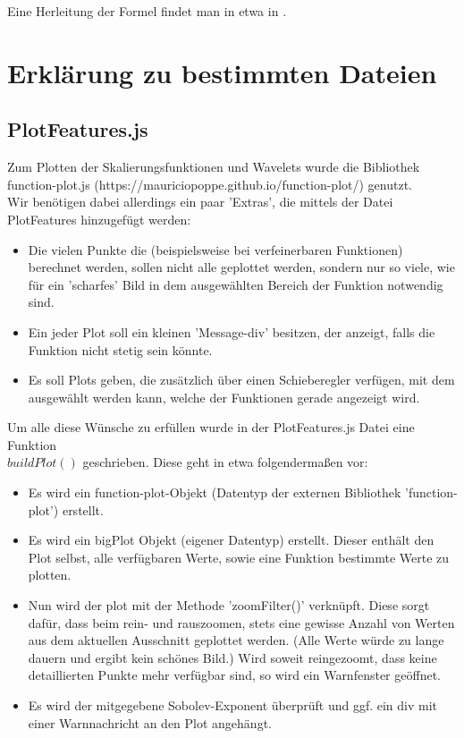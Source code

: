 \documentclass[11pt,a4paper,titlepage]{article}
\theoremstyle{plain} %
\theoremstyle{definition} %
\numberwithin{equation}{section} %
\begin{document}
	Eine Herleitung der Formel findet man in etwa in \cite{LycheMorken}.
	
	\newpage
	\section{Erklärung zu bestimmten Dateien}
				
		\subsection{PlotFeatures.js}
		Zum Plotten der Skalierungsfunktionen und Wavelets wurde die Bibliothek function-plot.js (https://mauriciopoppe.github.io/function-plot/) genutzt. \\
		Wir benötigen dabei allerdings ein paar 'Extras', die mittels der Datei PlotFeatures hinzugefügt werden:\\
		
		\begin{itemize}
			\item Die vielen Punkte die (beispielsweise bei verfeinerbaren Funktionen) berechnet werden, sollen nicht alle geplottet werden, sondern nur so viele, wie für ein 'scharfes' Bild in dem ausgewählten Bereich der Funktion notwendig sind.
			\item Ein jeder Plot soll ein kleinen 'Message-div' besitzen, der anzeigt, falls die Funktion nicht stetig sein könnte.
			\item Es soll Plots geben, die zusätzlich über einen Schieberegler verfügen, mit dem ausgewählt werden kann, welche der Funktionen gerade angezeigt wird.
		\end{itemize}
		
		Um alle diese Wünsche zu erfüllen wurde in der PlotFeatures.js Datei eine Funktion\\
		$buildPlot()$ geschrieben. Diese geht in etwa folgendermaßen vor:
		\begin{itemize}
			\item Es wird ein function-plot-Objekt (Datentyp der externen Bibliothek 'function-plot') erstellt.
			\item Es wird ein bigPlot Objekt (eigener Datentyp) erstellt. Dieser enthält den Plot selbst, alle verfügbaren Werte, sowie eine Funktion bestimmte Werte zu plotten.
			\item Nun wird der plot mit der Methode 'zoomFilter()' verknüpft. Diese sorgt dafür, dass beim rein- und rauszoomen, stets eine gewisse Anzahl von Werten aus dem aktuellen Ausschnitt geplottet  werden. (Alle Werte würde zu lange dauern und ergibt kein schönes Bild.) Wird soweit reingezoomt, dass keine detaillierten Punkte mehr verfügbar sind, so wird ein Warnfenster geöffnet. 
			\item Es wird der mitgegebene Sobolev-Exponent überprüft und ggf. ein div mit einer Warnnachricht an den Plot angehängt. 
		\end{itemize}
		
\end{document}
